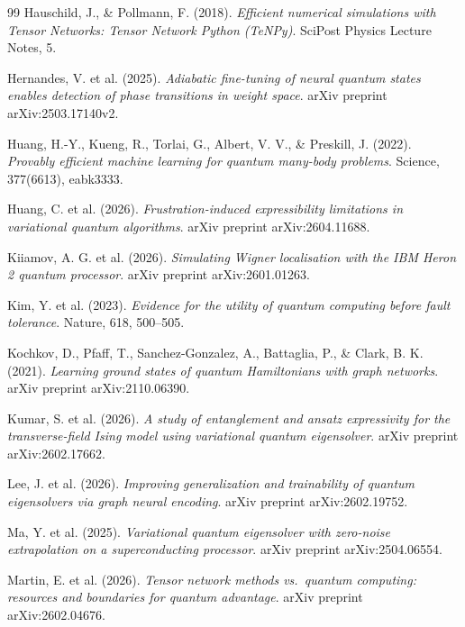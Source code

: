 \documentclass[11pt,a4paper,spanish]{book}
\begin{document}
\begin{thebibliography}{99}
 Hauschild, J., \& Pollmann, F. (2018). \emph{Efficient numerical simulations with Tensor Networks: Tensor Network Python (TeNPy)}. SciPost Physics Lecture Notes, 5.

 Hernandes, V. et al. (2025). \emph{Adiabatic fine-tuning of neural quantum states enables detection of phase transitions in weight space}. arXiv preprint arXiv:2503.17140v2.

 Huang, H.-Y., Kueng, R., Torlai, G., Albert, V. V., \& Preskill, J. (2022). \emph{Provably efficient machine learning for quantum many-body problems}. Science, 377(6613), eabk3333.

 Huang, C. et al. (2026). \emph{Frustration-induced expressibility limitations in variational quantum algorithms}. arXiv preprint arXiv:2604.11688.

 Kiiamov, A. G. et al. (2026). \emph{Simulating Wigner localisation with the IBM Heron 2 quantum processor}. arXiv preprint arXiv:2601.01263.

 Kim, Y. et al. (2023). \emph{Evidence for the utility of quantum computing before fault tolerance}. Nature, 618, 500--505.

 Kochkov, D., Pfaff, T., Sanchez-Gonzalez, A., Battaglia, P., \& Clark, B. K. (2021). \emph{Learning ground states of quantum Hamiltonians with graph networks}. arXiv preprint arXiv:2110.06390.

 Kumar, S. et al. (2026). \emph{A study of entanglement and ansatz expressivity for the transverse-field Ising model using variational quantum eigensolver}. arXiv preprint arXiv:2602.17662.

 Lee, J. et al. (2026). \emph{Improving generalization and trainability of quantum eigensolvers via graph neural encoding}. arXiv preprint arXiv:2602.19752.

 Ma, Y. et al. (2025). \emph{Variational quantum eigensolver with zero-noise extrapolation on a superconducting processor}. arXiv preprint arXiv:2504.06554.

 Martin, E. et al. (2026). \emph{Tensor network methods vs.\ quantum computing: resources and boundaries for quantum advantage}. arXiv preprint arXiv:2602.04676.


\end{thebibliography}
\end{document}
